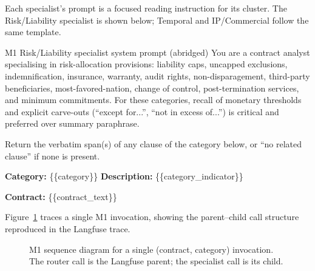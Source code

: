 Each specialist's prompt is a focused reading instruction for its cluster. The
Risk/Liability specialist is shown below; Temporal and IP/Commercial follow the same
template.

\begin{promptbox}{M1 Risk/Liability specialist system prompt (abridged)}
You are a contract analyst specialising in risk-allocation provisions: liability
caps, uncapped exclusions, indemnification, insurance, warranty, audit rights,
non-disparagement, third-party beneficiaries, most-favored-nation, change of control,
post-termination services, and minimum commitments. For these categories, recall of
monetary thresholds and explicit carve-outs (``except for...'', ``not in excess
of...'') is critical and preferred over summary paraphrase.

Return the verbatim span(s) of any clause of the category below, or ``no related
clause'' if none is present.

\textbf{Category:} \{\{category\}\} \quad
\textbf{Description:} \{\{category\_indicator\}\}

\textbf{Contract:} \{\{contract\_text\}\}
\end{promptbox}

Figure~\ref{fig:m1-sequence} traces a single M1 invocation, showing the parent--child
call structure reproduced in the Langfuse trace.

\begin{figure}[h]
  \centering
  \caption{M1 sequence diagram for a single (contract, category) invocation.
  The router call is the Langfuse parent; the specialist call is its child.}
  \label{fig:m1-sequence}
\end{figure}

